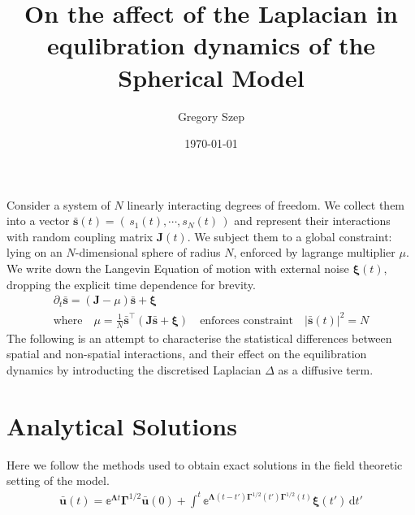 \documentclass{article}[12pt]
\numberwithin{equation}{section}
\begin{document}
\title{
On the affect of the Laplacian in equlibration
dynamics of the Spherical Model
}

\author{Gregory Szep}
\date{\today}

\maketitle
Consider a system of $N$ linearly interacting degrees of freedom. We collect
them into a vector $\bar{\mathbf{s}}(t) = \left(\,s_1(t),\cdots, s_N(t)\,\right)$
and represent their interactions with random coupling matrix $\mathbf{J}(t)$.
We subject them to a global constraint: lying on an $N$-dimensional sphere of
radius $N$, enforced by lagrange multiplier $\mu$. We write down the
Langevin Equation of motion with external noise $\boldsymbol\xi(t)$, dropping
the explicit time dependence for brevity.
\begin{gather}
\partial_t\bar{\mathbf{s}} = (\mathbf{J}-\mu)\bar{\mathbf{s}}+\boldsymbol\xi\quad\\
\text{where}\quad\mu = \frac{1}{N}\bar{\mathbf{s}}^{\top}\left(\mathbf{J}\bar{\mathbf{s}}+\boldsymbol\xi\right)\quad\text{enforces constraint}\quad|\bar{\mathbf{s}}(t)|^2=N
\end{gather}
The following is an attempt to characterise the statistical differences between
spatial and non-spatial interactions, and their effect on the equilibration
dynamics by introducting the discretised Laplacian $\Delta$ as a diffusive term.

\section{Analytical Solutions}
Here we follow the methods used to obtain exact solutions\cite{} in the
field theoretic setting of the model.
\begin{align*}
  \bar{\mathbf{u}}(t)=
    \mathbb{e}^{\mathbf{\Lambda}t}\mathbf\Gamma^{1/2}\bar{\mathbf{u}}(0)
    +\int^t\!\mathbb{e}^{\mathbf{\Lambda}(t-t')
    \mathbf\Gamma^{1/2}(t')\mathbf\Gamma^{1/2}(t)}\boldsymbol\xi(t')
    \,\mathrm{d}t'
\end{align*}
\end{document}
